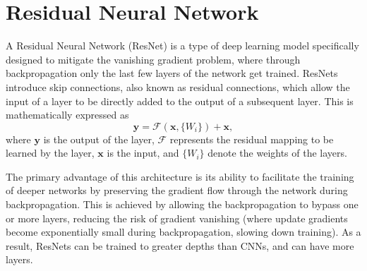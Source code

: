 





\section{Residual Neural Network}


A Residual Neural Network (ResNet) is a type of deep learning model specifically designed to mitigate the vanishing gradient problem, where through backpropagation only the last few layers of the network get trained. ResNets introduce skip connections, also known as residual connections, which allow the input of a layer to be directly added to the output of a subsequent layer. This is mathematically expressed as
\[
	\mathbf{y} = \mathcal{F}(\mathbf{x}, \{W_i\}) + \mathbf{x},
\]
where $\mathbf{y}$ is the output of the layer, $\mathcal{F}$ represents the residual mapping to be learned by the layer, $\mathbf{x}$ is the input, and $\{W_i\}$ denote the weights of the layers.

The primary advantage of this architecture is its ability to facilitate the training of deeper networks by preserving the gradient flow through the network during backpropagation. This is achieved by allowing the backpropagation to bypass one or more layers, reducing the risk of gradient vanishing (where update gradients become exponentially small during backpropagation, slowing down training). As a result, ResNets can be trained to greater depths than CNNs, and can have more layers.




